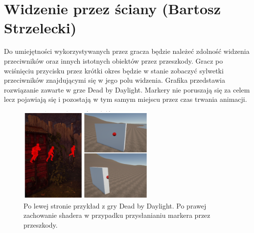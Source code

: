 \section{Widzenie przez ściany (Bartosz Strzelecki)}

Do umiejętności wykorzystywanych przez gracza będzie należeć zdolność widzenia przeciwników oraz innych istotnych obiektów przez przeszkody.
Gracz po wciśnięciu przycisku przez krótki okres będzie w stanie zobaczyć sylwetki przeciwników znajdującymi się w jego polu widzenia.
Grafika przedstawia rozwiązanie zawarte w grze Dead by Daylight. Markery nie poruszają się za celem lecz pojawiają się i pozostają w tym samym miejscu przez czas trwania animacji.

\begin{figure}[h]
\centering
\includegraphics[width=0.6\textwidth]{images/shader}
\caption{Po lewej stronie przykład z gry Dead by Daylight. Po prawej zachowanie shadera w przypadku przysłanianiu markera przez przeszkody.}
\end{figure}

